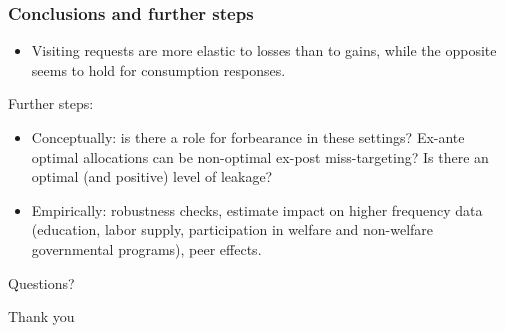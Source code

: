 \documentclass{beamer}
\begin{document}
\begin{frame}
\frametitle{Conclusions and further steps}
\begin{itemize}
	\item Visiting requests are more elastic to losses than to gains, while the opposite seems to hold for consumption responses.
\end{itemize}
Further steps:
\begin{itemize}
	\item Conceptually: is there a role for forbearance in these settings? Ex-ante optimal allocations can be non-optimal ex-post miss-targeting? Is there an optimal (and positive) level of leakage?
	\item Empirically: robustness checks, estimate impact on higher frequency data (education, labor supply, participation in welfare and non-welfare governmental programs), peer effects.
\end{itemize}

\end{frame}

\begin{frame}
\begin{center}
	{\Huge Questions?\par}
\end{center}
\end{frame}

\begin{frame}
\begin{center}
	{\Huge Thank you\par}
\end{center}
\end{frame}
\end{document}
